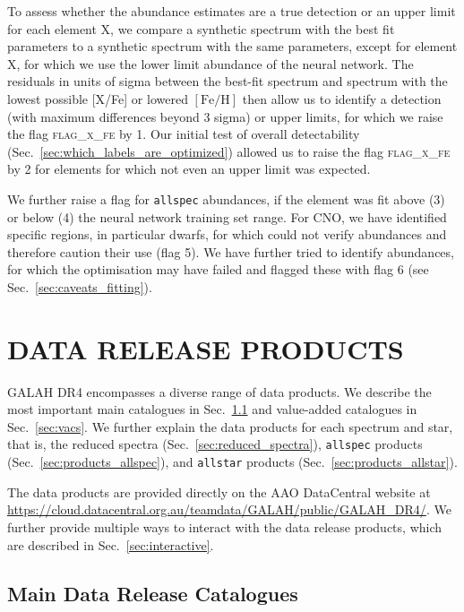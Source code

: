 \documentclass[
  journal=pasa,
  manuscript=research-paper, %
  year=2024,
  volume=37
]{cup-journal}
\newcommand{\feh}{$\mathrm{[Fe/H]}$\xspace}
\begin{document}
To assess whether the abundance estimates are a true detection or an upper limit for each element X, we compare a synthetic spectrum with the best fit parameters to a synthetic spectrum with the same parameters, except for element X, for which we use the lower limit abundance of the neural network. The residuals in units of sigma between the best-fit spectrum and spectrum with the lowest possible [X/Fe] or lowered \feh then allow us to identify a detection (with maximum differences beyond 3 sigma) or upper limits, for which we raise the flag \textsc{flag\_x\_fe} by 1. Our initial test of overall detectability (Sec.~\ref{sec:which_labels_are_optimized}) allowed us to raise the flag \textsc{flag\_x\_fe} by 2 for elements for which not even an upper limit was expected.

We further raise a flag for \texttt{allspec} abundances, if the element was fit above (3) or below (4) the neural network training set range. For CNO, we have identified specific regions, in particular dwarfs, for which could not verify abundances and therefore caution their use (flag 5). We have further tried to identify abundances, for which the optimisation may have failed and flagged these with flag 6 (see Sec.~\ref{sec:caveats_fitting}).

\section{DATA RELEASE PRODUCTS}
\label{sec:catalogues_release_products}

GALAH DR4 encompasses a diverse range of data products. We describe the most important main catalogues in Sec.~\ref{sec:data_release_catalogues} and value-added catalogues in Sec.~\ref{sec:vacs}. We further explain the data products for each spectrum and star, that is, the reduced spectra (Sec.~\ref{sec:reduced_spectra}), \texttt{allspec} products (Sec.~\ref{sec:products_allspec}), and \texttt{allstar} products (Sec.~\ref{sec:products_allstar}).

The data products are provided directly on the AAO DataCentral website at \url{https://cloud.datacentral.org.au/teamdata/GALAH/public/GALAH_DR4/}. We further provide multiple ways to interact with the data release products, which are described in Sec.~\ref{sec:interactive}.

\subsection{Main Data Release Catalogues}
\label{sec:data_release_catalogues}
\end{document}
